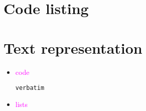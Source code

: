 \documentclass[a4paper,10pt]{article}
\begin{document}
\section{Code listing}
\section{Text representation}
\begin{itemize}
\item \textcolor{magenta}{code} 
\begin{verbatim} 
verbatim
\end{verbatim}
\item \textcolor{magenta}{lists}
\end{itemize}
\end{document}
